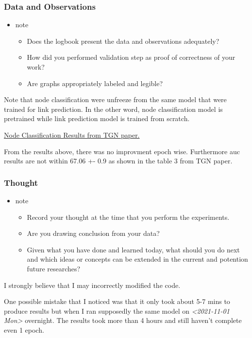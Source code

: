 \documentclass[11pt]{article}
\begin{document}
\subsubsection{Data and Observations}
\label{sec:org27c0ba4}
\begin{itemize}
\item note
\begin{itemize}
\item Does the logbook present the data and observations adequately?
\item How did you performed validation step as proof of correctness of your work?
\item Are graphs appropriately labeled and legible?
\end{itemize}
\end{itemize}

Note that node classification were unfreeze from the same model that were trained for link prediction. In the other word, node classification model is pretrained while link prediction model is trained from scratch.

\href{file:///mnt/c/Users/terng/OneDrive/Documents/Working/tgn/references/node classification results from TGN paper.PNG}{Node Classification Results from TGN paper.}

From the results above, there was no improvment epoch wise.
Furthermore auc results are not within 67.06 +- 0.9 as shown in the table 3 from TGN paper.


\subsubsection{Thought}
\label{sec:org71af5b4}
\begin{itemize}
\item note
\begin{itemize}
\item Record your thought at the time that you perform the experiments.
\item Are you drawing conclusion from your data?
\item Given what you have done and learned today, what should you do next and which ideas or concepts can be extended in the current and potention future researches?
\end{itemize}
\end{itemize}

I strongly believe that I may incorrectly modified the code.

One possible mistake that I noticed was that it only took about 5-7 mins to produce results
but when I ran supposedly the same model on \textit{<2021-11-01 Mon> } overnight. The results took more than 4 hours and still haven't complete even 1 epoch.
\end{document}
